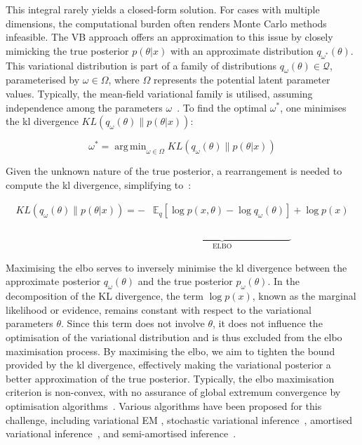 \documentclass[3p,review,authoryear]{elsarticle}
\DeclareMathOperator*{\argmin}{arg\,min}
\begin{document}
This integral rarely yields a closed-form solution.
For cases with multiple dimensions, the computational burden often renders Monte Carlo methods infeasible.
The VB approach offers an approximation to this issue by closely mimicking the true posterior $p(\theta|x)$ with an approximate distribution $q_{\omega^*}(\theta)$. This variational distribution is part of a family of distributions $q_\omega(\theta)\in \mathcal{Q}$, parameterised by $\omega \in \Omega$, where $\Omega$ represents the potential latent parameter values.
Typically, the mean-field variational family is utilised, assuming independence among the parameters $\omega$~\citep{Blei_2017}. 
To find the optimal $\omega^*$, one minimises the \gls{kl} divergence $KL(q_\omega(\theta) \parallel p(\theta|x))$:

\begin{equation}
\omega^* = \argmin_{\omega \in \Omega}KL(q_\omega(\theta) \parallel p(\theta|x))
\label{eq:optim}
\end{equation}

Given the unknown nature of the true posterior, a rearrangement is needed to compute the \gls{kl} divergence, simplifying to~\citep[Chapter~10]{murphy2023probabilistic}:

\begin{align*}
KL(q_\omega(\theta) \parallel p(\theta|x)) = - & \mathbb{E}_q\left[\log p(x,\theta) - \log q_\omega(\theta)\right] + \log p(x)\\
& \underbrace{\phantom{\mathbb{E}_q\left[\log p(x,\theta) - \log q_\omega(\theta)\right]}}_{\text{ELBO}}
\label{eq:kl_divergence}
\end{align*}

Maximising the \gls{elbo} serves to inversely minimise the \gls{kl} divergence between the approximate posterior \(q_\omega(\theta)\) and the true posterior \(p_\omega(\theta)\).
In the decomposition of the KL divergence, the term \(\log p(x)\), known as the marginal likelihood or evidence, remains constant with respect to the variational parameters \(\theta\).
Since this term does not involve \(\theta\), it does not influence the optimisation of the variational distribution and is thus excluded from the \gls{elbo} maximisation process.
By maximising the \gls{elbo}, we aim to tighten the bound provided by the \gls{kl} divergence, effectively making the variational posterior a better approximation of the true posterior.
Typically, the \gls{elbo} maximisation criterion is non-convex, with no assurance of global extremum convergence by optimisation algorithms~\citep[Chapter~10]{murphy2023probabilistic}.
Various algorithms have been proposed for this challenge, including variational EM \citep{bernardo2003variational}, stochastic variational inference~\citep{hoffman2013stochastic, sashank2018convergence}, amortised variational inference~\citep{gershman2014amortized, le2017inference}, and semi-amortised inference~\citep{kim2018semi}.
\end{document}
